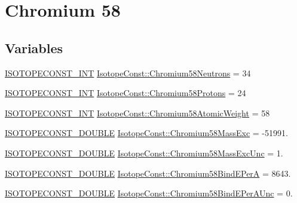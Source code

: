 \hypertarget{group___isotope_const-_chromium-_cr58}{}\section{Chromium 58}
\label{group___isotope_const-_chromium-_cr58}
\subsection*{Variables}
\begin{DoxyCompactItemize}
\item 
\mbox{\hyperlink{group___isotope_const-_macros_ga5f18360b3e99483a35c32d789e62621c}{I\+S\+O\+T\+O\+P\+E\+C\+O\+N\+S\+T\+\_\+\+I\+NT}} \mbox{\hyperlink{group___isotope_const-_chromium-_cr58_gadfe53be9bf0c2798c98c675b7ad7b5e9}{Isotope\+Const\+::\+Chromium58\+Neutrons}} = 34
\item 
\mbox{\hyperlink{group___isotope_const-_macros_ga5f18360b3e99483a35c32d789e62621c}{I\+S\+O\+T\+O\+P\+E\+C\+O\+N\+S\+T\+\_\+\+I\+NT}} \mbox{\hyperlink{group___isotope_const-_chromium-_cr58_ga7f9344b13388b66575be69b814211dd7}{Isotope\+Const\+::\+Chromium58\+Protons}} = 24
\item 
\mbox{\hyperlink{group___isotope_const-_macros_ga5f18360b3e99483a35c32d789e62621c}{I\+S\+O\+T\+O\+P\+E\+C\+O\+N\+S\+T\+\_\+\+I\+NT}} \mbox{\hyperlink{group___isotope_const-_chromium-_cr58_ga0b3bb6a9a713a6ad50ed5abf50e31150}{Isotope\+Const\+::\+Chromium58\+Atomic\+Weight}} = 58
\item 
\mbox{\hyperlink{group___isotope_const-_macros_ga8f45a7272ce02c0b4c65c44636ed719a}{I\+S\+O\+T\+O\+P\+E\+C\+O\+N\+S\+T\+\_\+\+D\+O\+U\+B\+LE}} \mbox{\hyperlink{group___isotope_const-_chromium-_cr58_ga3df30bc68d2711be6806d3123508c073}{Isotope\+Const\+::\+Chromium58\+Mass\+Exc}} = -\/51991.
\item 
\mbox{\hyperlink{group___isotope_const-_macros_ga8f45a7272ce02c0b4c65c44636ed719a}{I\+S\+O\+T\+O\+P\+E\+C\+O\+N\+S\+T\+\_\+\+D\+O\+U\+B\+LE}} \mbox{\hyperlink{group___isotope_const-_chromium-_cr58_gac633161f515541783e885ace272b4864}{Isotope\+Const\+::\+Chromium58\+Mass\+Exc\+Unc}} = 1.
\item 
\mbox{\hyperlink{group___isotope_const-_macros_ga8f45a7272ce02c0b4c65c44636ed719a}{I\+S\+O\+T\+O\+P\+E\+C\+O\+N\+S\+T\+\_\+\+D\+O\+U\+B\+LE}} \mbox{\hyperlink{group___isotope_const-_chromium-_cr58_ga6290a3f1c02102e20bd75d312019422a}{Isotope\+Const\+::\+Chromium58\+Bind\+E\+PerA}} = 8643.
\item 
\mbox{\hyperlink{group___isotope_const-_macros_ga8f45a7272ce02c0b4c65c44636ed719a}{I\+S\+O\+T\+O\+P\+E\+C\+O\+N\+S\+T\+\_\+\+D\+O\+U\+B\+LE}} \mbox{\hyperlink{group___isotope_const-_chromium-_cr58_ga778e2220d2c4196477703e96fe6886c9}{Isotope\+Const\+::\+Chromium58\+Bind\+E\+Per\+A\+Unc}} = 0.

\end{DoxyCompactItemize}
